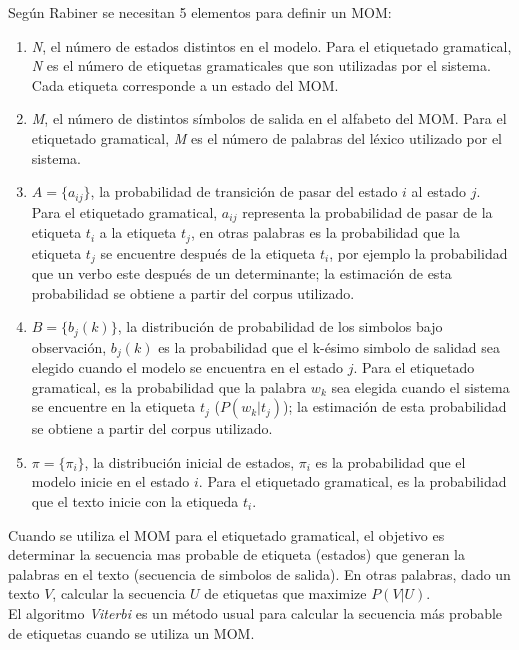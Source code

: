 Seg\'un Rabiner \cite{TH99} se necesitan 5 elementos para definir un MOM:
\begin{enumerate}
	\item \emph{N}, el n\'umero de estados distintos en el modelo. Para el etiquetado
	gramatical, \emph{N} es el n\'umero de etiquetas gramaticales que son utilizadas 
	por el sistema. Cada etiqueta corresponde a un estado del MOM.
	\item \emph{M}, el n\'umero de distintos s\'imbolos de salida en el alfabeto del
	MOM. Para el etiquetado gramatical, \emph{M} es el n\'umero de palabras del
	l\'exico utilizado por el sistema.
	\item $A = \{a_{ij}\}$, la probabilidad de transici\'on de pasar del estado $i$ al 
	estado $j$.  Para el etiquetado gramatical,  $a_{ij}$ representa  la probabilidad de 
	pasar de la etiqueta $t_i$ a la etiqueta $t_j$, en otras palabras es la probabilidad
	que la etiqueta $t_j$ se encuentre despu\'es de la etiqueta $t_i$, por ejemplo
	la probabilidad que un verbo este despu\'es de un determinante; la estimaci\'on
	de esta probabilidad se obtiene a partir del corpus utilizado.
	\item $B=\{b_j(k)\}$, la distribuci\'on de probabilidad de los simbolos bajo
	observaci\'on, $b_j(k)$ es la probabilidad que el k-\'esimo simbolo de salidad sea 
	elegido cuando el modelo se encuentra en el estado $j$. Para el etiquetado 
	gramatical, es la probabilidad que la palabra $w_k$ sea elegida cuando el sistema se 
	encuentre en la etiqueta $t_j$ ($P(w_k|t_j)$); la estimaci\'on de esta probabilidad
	se obtiene a partir del corpus utilizado.
	\item $\pi = \{\pi_i\}$, la distribuci\'on inicial de estados, $\pi_i$ es la
	probabilidad que el modelo inicie en el estado $i$. Para el etiquetado gramatical,
	es la probabilidad que el texto inicie con la etiqueda $t_i$.
\end{enumerate}

Cuando se utiliza el MOM para el etiquetado gramatical, el objetivo es determinar
la secuencia mas probable de etiqueta (estados) que generan la palabras en el texto
(secuencia de simbolos de salida). En otras palabras, dado un texto $V$, calcular
la secuencia $U$ de etiquetas que maximize $P(V|U)$.\\

El algoritmo \emph{Viterbi} es un m\'etodo usual para calcular la secuencia m\'as
probable de etiquetas cuando se utiliza un MOM.




